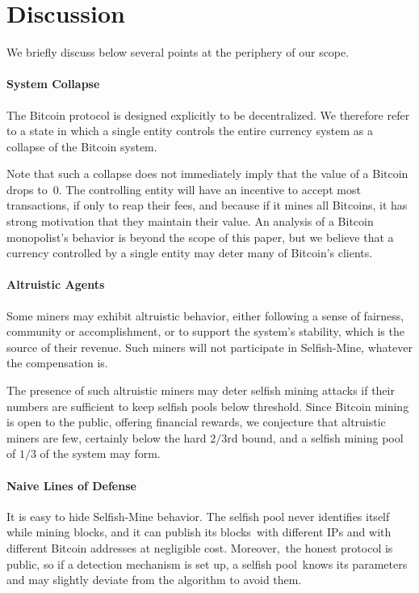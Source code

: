 \documentclass[letterpaper]{llncs}
\newcommand{\negspace}{\vspace{-0.5\baselineskip}}
\begin{document}
    \negspace
    \section{Discussion} \label{sec:discussion} 
    \negspace

We briefly discuss below several points at the periphery of our scope. 

\paragraph{System Collapse} 

The Bitcoin protocol is designed explicitly to be decentralized. 
We therefore refer to a state in which a single entity controls the entire currency system as a collapse of the Bitcoin system. 

Note that such a collapse does not immediately imply that the value of a Bitcoin drops to~0. 
The controlling entity will have an incentive to accept most transactions, if only to reap their fees, and because if it mines all Bitcoins, it has strong motivation that they maintain their value. 
An analysis of a Bitcoin monopolist's behavior is beyond the scope of this paper, but we believe that a currency controlled by a single entity may deter many of Bitcoin's clients. 

\paragraph{Altruistic Agents} 

Some miners may exhibit altruistic behavior, either following a sense of fairness, community or accomplishment, or to support the system's stability, which is the source of their revenue. Such miners will not participate in Selfish-Mine, whatever the compensation is. 

The presence of such altruistic miners may deter selfish mining attacks if their numbers are sufficient to keep selfish pools below threshold. 
Since Bitcoin mining is open to the public, offering financial rewards, we conjecture that altruistic miners are few, certainly below the hard $2/3$rd bound, and a selfish mining pool of $1/3$ of the system may form. 

\paragraph{Naive Lines of Defense} 

It is easy to hide Selfish-Mine behavior. The selfish pool never identifies itself while mining blocks, and it can publish its blocks~with different IPs and with different Bitcoin addresses at negligible cost. Moreover,~the honest protocol is public, so if a detection mechanism is set up, a selfish pool~knows its parameters and may slightly deviate from the algorithm to avoid them. 
\end{document}
